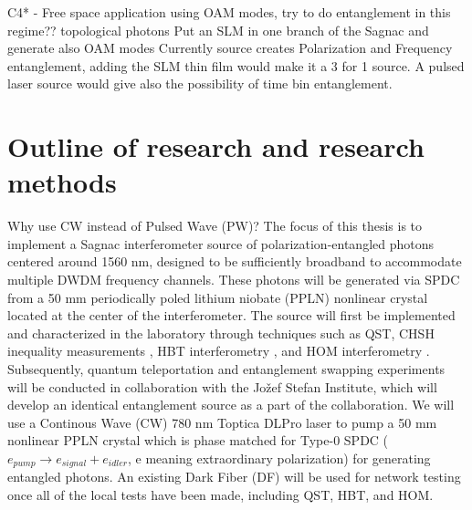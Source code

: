 \documentclass{article}
\theoremstyle{mytheoremstyle}
\theoremstyle{mytheoremstyle}
\theoremstyle{myproblemstyle}
\begin{document}
C4* - Free space application using OAM modes, try to do entanglement in this regime?? topological photons
Put an SLM in one branch of the Sagnac and generate also OAM modes
Currently source creates Polarization and Frequency entanglement, adding the SLM thin film would make it a 3 for 1 source. A pulsed laser source would give
also the possibility of time bin entanglement.


\newpage
\section{Outline of research and research methods}


Why use CW instead of Pulsed Wave (PW)?
The focus of this thesis is to implement a Sagnac interferometer source of polarization-entangled photons centered around 1560 nm,
designed to be sufficiently broadband to accommodate multiple DWDM frequency channels.
These photons will be generated via SPDC \cite{jesseSPDC} from a
50 mm periodically poled lithium niobate (PPLN) nonlinear crystal located at the center of the interferometer.
The source will first be implemented and characterized in the laboratory through techniques such as QST,
CHSH inequality measurements \cite{Clauser_Horne_Shimony_Holt_1969},
HBT interferometry \cite{Brown_Twiss_1954}, and HOM interferometry \cite{Hong_Ou_Mandel_1987}.
Subsequently, quantum teleportation \cite{Bouwmeester_Pan_Mattle_Eibl_Weinfurter_Zeilinger_1997}
and entanglement swapping \cite{Jennewein_Weihs_Pan_Zeilinger_2001} experiments will be conducted in collaboration with the Jožef Stefan Institute,
which will develop an identical entanglement source as a part of the collaboration.
We will use a Continous Wave (CW) 780 nm Toptica DLPro laser to pump a 50 mm nonlinear PPLN crystal which is phase matched for Type-0 SPDC ($e_{pump} \rightarrow e_{signal} + e_{idler}$, e meaning extraordinary polarization)
for generating entangled photons.
An existing Dark Fiber (DF) will be used for network testing once all of the local tests have been made, including QST, HBT, and HOM.
\end{document}

